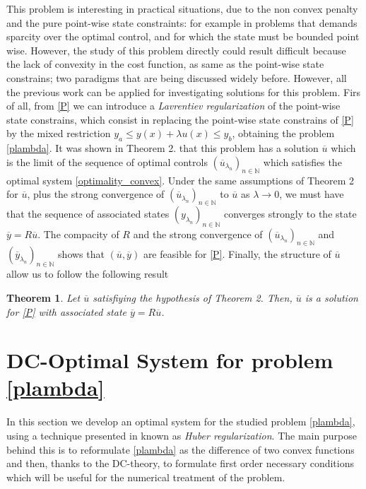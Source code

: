 \documentclass[11pt,a4paper]{amsart}
\newtheorem{theorem}{{Theorem}}
\begin{document}
This problem is interesting in practical situations, due to the non convex penalty and the pure point-wise state constraints: for example in problems that demands sparcity over the optimal control, and for which the state must be bounded point wise. However, the study of this problem directly could result difficult because the lack of convexity in the cost function, as same as the point-wise state constrains; two paradigms that are being discussed widely before. However, all the previous work can be applied for investigating solutions for this problem. Firs of all, from \eqref{P} we can introduce a \textit{Lavrentiev regularization} of the point-wise state constrains, which consist in replacing the point-wise state constrains of \eqref{P} by the mixed restriction $y_a\le y(x)+\lambda u(x)\le y_b$, obtaining the problem \eqref{plambda}. It was shown in Theorem 2. that this problem has a solution $\overline{u}$ which is the limit of the sequence of optimal controls $(\overline{u}_{\lambda_n})_{n\in\mathbb{N}}$ which satisfies the optimal system \eqref{optimality_convex}. Under the same assumptions of Theorem 2 for $\overline{u}$, plus the strong convergence of $(\overline{u}_{\lambda_n})_{n\in\mathbb{N}}$ to $\overline{u}$ as $\lambda \to 0$, we must have that the sequence of associated states $(y_{\lambda_n})_{n\in\mathbb{N}}$ converges strongly to the state $\overline{y}=R\overline{u}$. The compacity of $R$ and the strong convergence of $(\overline{u}_{\lambda_n})_{n\in\mathbb{N}}$ and $(\overline{y}_{\lambda_n})_{n\in\mathbb{N}}$ shows that $(\overline{u}, \overline{y})$ are feasible for \eqref{P}. Finally, the structure of $\overline{u}$ allow us to follow the following result
\begin{theorem}
    Let $\overline{u}$ satisfiying the hypothesis of Theorem 2. Then, $\overline{u}$ is a solution for \eqref{P} with associated state $\overline{y}=R\overline{u}$.
\end{theorem}


\section{DC-Optimal System for problem \eqref{plambda}}

In this section we develop an optimal system for the studied problem \eqref{plambda}, using a technique presented in \cite{merino} known as \textit{Huber regularization}. The main purpose behind this is to reformulate \eqref{plambda} as the difference of two convex functions and then, thanks to the DC-theory, to formulate first order necessary conditions which will be useful for the numerical treatment of the problem. 
\end{document}

